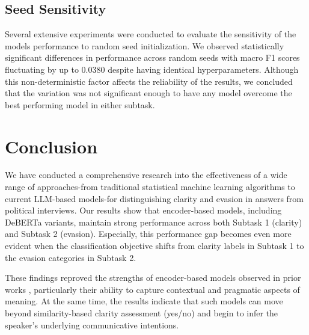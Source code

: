 \documentclass[11pt]{article}
\begin{document}
\subsection{Seed Sensitivity}
Several extensive experiments were conducted to evaluate the sensitivity of the models performance to random seed initialization. We observed statistically significant differences in performance across random seeds with macro F1 scores fluctuating by up to 0.0380 despite having identical hyperparameters. Although this non-deterministic factor affects the reliability of the results, we concluded that the variation was not significant enough to have any model overcome the best performing model in either subtask.


\section{Conclusion}

We have conducted a comprehensive research into the effectiveness of a wide range of approaches-from traditional statistical machine learning algorithms to current LLM-based models-for distinguishing clarity and evasion in answers from political interviews. Our results show that encoder-based models, including DeBERTa variants, maintain strong performance across both Subtask 1 (clarity) and Subtask 2 (evasion). Especially, this performance gap becomes even more evident when the classification objective shifts from clarity labels in Subtask 1 to the evasion categories in Subtask 2.

These findings reproved the strengths of encoder-based models observed in prior works \citep{Alvarez_Morrier_2025, nuaimi-etal-2025-detecting, fornaciari-etal-2021-bertective}, particularly their ability to capture contextual and pragmatic aspects of meaning. At the same time, the results indicate that such models can move beyond similarity-based clarity assessment (yes/no) and begin to infer the speaker’s underlying communicative intentions.


%


\end{document}
